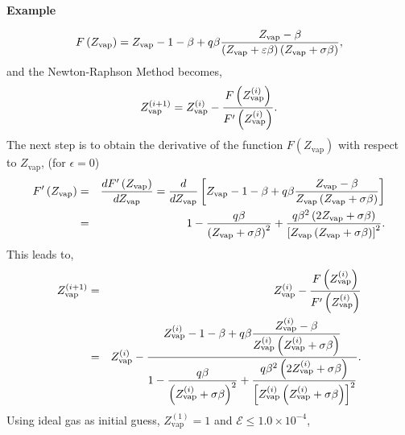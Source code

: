 \begin{MyExample}{\begin{center}{\bf Example}\end{center}}
\begin{enumerate}[a)]
                  \begin{displaymath}
                     F\left(Z_{\text{vap}}\right) = Z_{\text{vap}} - 1 - \beta + q\beta \displaystyle\frac{Z_{\text{vap}} - \beta} {\left(Z_{\text{vap}}+\varepsilon\beta\right)\left(Z_{\text{vap}} +\sigma\beta\right)},
                  \end{displaymath}
                  and the Newton-Raphson Method becomes,
                  \begin{displaymath}
                     Z_{\text{vap}}^{(i+1)} = Z_{\text{vap}}^{(i)} - \displaystyle\frac{F\left(Z_{\text{vap}}^{(i)}\right)}{F^{\prime}\left(Z_{\text{vap}}^{(i)}\right)}.
                  \end{displaymath}
                  The next step is to obtain the derivative of the function $F\left(Z_{\text{vap}}\right)$ with respect to $Z_{\text{vap}}$, \ie (for $\epsilon=0$)
                  \begin{eqnarray}
                     F^{\prime}\left(Z_{\text{vap}}\right) &=& \displaystyle\frac{d F^{\prime}\left(Z_{\text{vap}}\right)}{d Z_{\text{vap}}} = \displaystyle\frac{d}{dZ_{\text{vap}}} \left[Z_{\text{vap}} - 1 - \beta + q\beta \displaystyle\frac{Z_{\text{vap}}-\beta}{Z_{\text{vap}}\left(Z_{\text{vap}}+\sigma\beta\right)}\right]\nonumber \\
                                                       &=& 1 - \displaystyle\frac{q\beta}{\left(Z_{\text{vap}}+\sigma\beta\right)^{2}} + \displaystyle\frac{q\beta^{2}\left(2Z_{\text{vap}}+\sigma\beta\right)}{\left[Z_{\text{vap}}\left(Z_{\text{vap}}+\sigma\beta\right)\right]^{2}}. \nonumber
                  \end{eqnarray}
                  This leads to,
                  \begin{eqnarray}
                     Z_{\text{vap}}^{(i+1)} &=& Z_{\text{vap}}^{(i)} - \displaystyle\frac{F\left(Z_{\text{vap}}^{(i)}\right)}{F^{\prime}\left(Z_{\text{vap}}^{(i)}\right)} \nonumber \\
                     &=& Z_{\text{vap}}^{(i)} - \displaystyle\frac{Z_{\text{vap}}^{(i)} - 1 - \beta + q\beta \displaystyle\frac{Z_{\text{vap}}^{(i)} - \beta} {Z_{\text{vap}}^{(i)}\left(Z_{\text{vap}}^{(i)} +\sigma\beta\right)}}{1 - \displaystyle\frac{q\beta}{\left(Z_{\text{vap}}^{(i)}+\sigma\beta\right)^{2}} + \displaystyle\frac{q\beta^{2}\left(2Z_{\text{vap}}^{(i)}+\sigma\beta\right)}{\left[Z_{\text{vap}}^{(i)}\left(Z_{\text{vap}}^{(i)}+\sigma\beta\right)\right]^{2}}}. \nonumber
                  \end{eqnarray}
                  Using ideal gas as initial guess, \ie $Z_{\text{vap}}^{(1)}=1$ and $\mathcal{E} \leq 1.0\times 10^{-4}$,
                 \begin{center}

\end{center}
\end{enumerate}
\end{MyExample}

